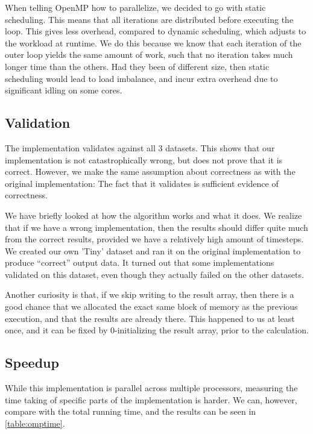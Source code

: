 \documentclass[11pt]{article}
\begin{document}
When telling OpenMP how to parallelize, we decided to go with static scheduling.
This means that all iterations are distributed before executing the loop. This gives
less overhead, compared to dynamic scheduling, which adjusts to the workload at runtime. We do
this because we know that each iteration of the outer loop yields the same
amount of work, such that no iteration takes much longer time than the others.
Had they been of different size, then static scheduling would lead to load 
imbalance, and incur extra overhead due to significant idling on some cores.


\subsection{Validation}
The implementation validates against all 3 datasets. This shows that our
implementation is not catastrophically wrong, but does not prove that it is
correct. However, we make the same assumption about correctness as with the 
original implementation: The fact that it validates is sufficient evidence of correctness.

We have briefly looked at how the algorithm works and what it does. We
realize that if we have a wrong implementation, then the results should differ quite much from the correct results, provided we have a relatively high amount of timesteps. We created our own 'Tiny' dataset and ran it on the original implementation to produce ``correct'' output data. It turned out that some implementations validated on this dataset, even though they actually failed on the other datasets.

Another curiosity is that, if we skip writing to the result array, then there
is a good chance that we allocated the exact same block of memory as the 
previous execution, and that the results are already there. This happened to us
at least once, and it can be fixed by 0-initializing the result array, prior to
the calculation.


\subsection{Speedup}
While this implementation is parallel across multiple processors, measuring the
time taking of specific parts of the implementation is harder. We can, however, 
compare with the total running time, and the results can be seen in 
\autoref{table:omptime}.
\end{document}
